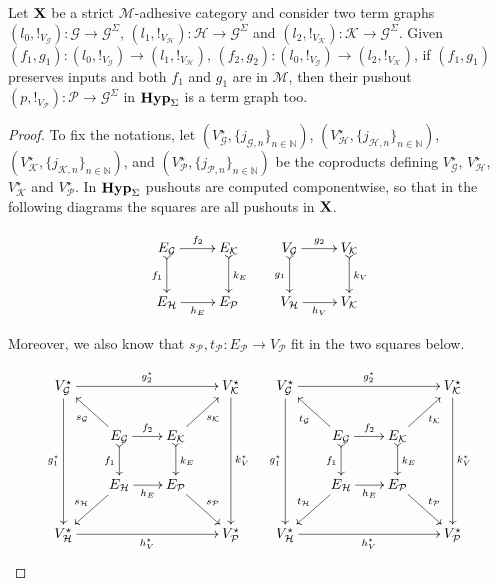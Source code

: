 \documentclass[runningheads,envcountsect]{llncs}
\def\X{\textbf {\textup{X}}}
\newcommand{\catname}[1]{\textbf{\textup{#1}}}
\newcommand{\hyp}{\catname{Hyp}}
\newcommand{\hyps}{\catname{Hyp}_{\Sigma}}
\begin{document}
\begin{lemma}\label{prop:push}Let $\X$ be a strict $\mathcal{M}$-adhesive category and consider two term graphs $(l_0, !_{V_\mathcal{G}})\colon \mathcal{G}\to \mathcal{G}^{\Sigma}$, $(l_1, !_{V_\mathcal{H}})\colon \mathcal{H}\to \mathcal{G}^{\Sigma}$ and $(l_2, !_{V_\mathcal{K}})\colon \mathcal{K}\to \mathcal{G}^{\Sigma}$. Given $(f_1, g_1)\colon (l_0, !_{V_\mathcal{G}})\to (l_1, !_{V_\mathcal{H}})$, $(f_2, g_2)\colon (l_0, !_{V_\mathcal{G}})\to (l_2, !_{V_\mathcal{K}})$, if $(f_1, g_1)$ preserves inputs and both $f_1$ and $g_1$ are in $\mathcal{M}$,  then their pushout $(p, !_{V_{\mathcal{P}}})\colon \mathcal{P}\to \mathcal{G}^{\Sigma}$ in $\hyp_{\Sigma}$ is a term graph too.
\end{lemma}


\begin{proof} To fix the notations, let $(V^\star_{\mathcal{G}}, \{j_{\mathcal{{G}}, n} \}_{n\in \mathbb{N} })$, $(V^\star_{\mathcal{H}}, \{j_{\mathcal{{H}}, n} \}_{n\in \mathbb{N} })$, $(V^\star_{\mathcal{K}}, \{j_{\mathcal{{K}}, n} \}_{n\in \mathbb{N} })$, and $(V^\star_{\mathcal{P}}, \{j_{\mathcal{{P}}, n} \}_{n\in \mathbb{N} })$ be the coproducts defining $V^\star_{\mathcal{G}}$, $V^\star_{\mathcal{H}}$, $V^\star_{\mathcal{K}}$ and $V^\star_{\mathcal{P}}$. In $\hyps$ pushouts are computed componentwise, so that in the following diagrams the squares are all pushouts in $\X$.

	\[\xymatrix{E_{\mathcal{G}} \ar[r]^{f_2} \ar@{>->}[d]_{f_1} & E_{\mathcal{K}} \ar@{>->}[d]^{k_E} & V_{\mathcal{G}}  \ar[r]^{g_2} \ar@{>->}[d]_{g_1}& V_{\mathcal{K}} \ar@{>->}[d]^{k_V}\\ E_{\mathcal{H}} \ar[r]_{h_E} & E_{\mathcal{P}} & V_{\mathcal{H}}  \ar[r]_{h_V}& V_{\mathcal{K}}}\]

Moreover, we also know that $s_\mathcal{P}, t_{\mathcal{P}}\colon E_{\mathcal{P}}\to V_{\mathcal{P}}$  fit in the two squares below.

	\[\xymatrix@C=20pt@R=20pt{V^\star_{\mathcal{G}} \ar[ddd]_{g^\star_1}\ar[rrr]^{g^\star_2} &&&V^\star_{\mathcal{K}} \ar[ddd]^{k^\star_V} & V^\star_{\mathcal{G}} \ar[ddd]_{g^\star_1} \ar[rrr]^{g^\star_2}&&& V^\star_{\mathcal{K}}\ar[ddd]^{k^\star_V} \\ & E_{\mathcal{G}} \ar[ul]^{s_{\mathcal{G}}} \ar[r]^{f_2} \ar@{>->}[d]_{f_1} & E_{\mathcal{K}} \ar[ur]_{s_{\mathcal{K}}} \ar@{>->}[d]^{k_E}&&& E_{\mathcal{G}} \ar[ul]^{t_{\mathcal{G}}} \ar[r]^{f_2} \ar@{>->}[d]_{f_1} & E_{\mathcal{K}}\ar[ur]_{t_{\mathcal{K}}}\ar@{>->}[d]^{k_E} \\ & E_{\mathcal{H}} \ar[dl]_{s_{\mathcal{H}}} \ar[r]_{h_E} & E_{\mathcal{P}} \ar[dr]^{s_{\mathcal{P}}}&&& E_{\mathcal{H}} \ar[dl]_{t_{\mathcal{H}}}\ar[r]_{h_E} & E_{\mathcal{P}} \ar[dr]^{t_{\mathcal{P}}} \\V^\star_{\mathcal{H}} \ar[rrr]_{h^\star_V} &&&V^\star_{\mathcal{P}} & V^\star_{\mathcal{H}}\ar[rrr]_{h^\star_V} &&& V^\star_{\mathcal{P}}}\]


\end{proof}
\end{document}
